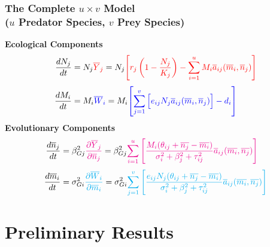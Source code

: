 \documentclass[10pt]{beamer}
\begin{document}
\begin{frame}
	\frametitle{The Complete $u\times v$ Model \\ ($u$ Predator Species, $v$ Prey Species)}
	{\bf Ecological Components}
	\begin{align*}
		\frac{dN_j}{dt} &= N_j{\color{red}\overline{Y}_j} = N_j {\color{red}\left[r_j\left(1 - \frac{N_j}{K_j}\right) - \sum\limits_{i = 1}^{u}M_i\overline{a}_{ij}(\overline{m}_i, \overline{n}_j)\right]} \\[.1cm]
		\frac{dM_i}{dt} &= M_i{\color{blue}\overline{W}_i} = M_i {\color{blue}\left[\sum\limits_{j = 1}^{v}\Big[e_{ij}N_j\overline{a}_{ij}(\overline{m}_i, \overline{n}_j)\Big] - d_i\right]}
	\end{align*}
	{\bf Evolutionary Components}
	\begin{align*}
	\frac{d\overline{n}_j}{dt} &= \beta_{Gj}^2{\color{magenta}\frac{\partial \overline{Y}_j}{\partial \overline{n}_j}} = \beta_{Gj}^2{\color{magenta}\sum\limits_{i=1}^{u}\left[\frac{M_i(\theta_{ij} + \overline{n_j} - \overline{m_i})}{\sigma_i^2 + \beta_j^2 + \tau_{ij}^2} \overline{a}_{ij}(\overline{m_i}, \overline{n_j})\right]}\\[.1cm]
	\frac{d\overline{m}_i}{dt} &= \sigma_{Gi}^2{\color{cyan}\frac{\partial \overline{W}_i}{\partial \overline{m}_i}} = \sigma_{Gi}^2{\color{cyan}\sum\limits_{j=1}^{v}\left[\frac{e_{ij}N_j(\theta_{ij} + \overline{n_j} - \overline{m_i})}{\sigma_i^2 + \beta_j^2 + \tau_{ij}^2} \overline{a}_{ij}(\overline{m_i}, \overline{n_j})\right]}
	\end{align*}
\end{frame}

\section{Preliminary Results}
\end{document}
